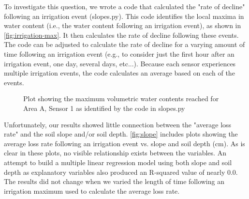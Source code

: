 \documentclass[12pt]{scrartcl}
\begin{document}
To investigate this question, we wrote a code that calculated the "rate of decline" following an irrigation event (slopes.py). This code identifies the local maxima in water content (i.e., the water content following an irrigation event), as shown in \autoref{fig:irrigation-max}. It then calculates the rate of decline following these events. The code can be adjusted to calculate the rate of decline for a varying amount of time following an irrigation event (e.g., to consider just the first hour after an irrigation event, one day, several days, etc...). Because each sensor experiences multiple irrigation events, the code calculates an average based on each of the events.

\begin{figure}[!htb]
        \caption{\label{fig:irrigation-max} Plot showing the maximum volumetric water contents reached for Area A, Sensor 1 as identified by the code in slopes.py}
\end{figure}

Unfortunately, our results showed little connection between the "average loss rate" and the soil slope and/or soil depth. \autoref{fig:slope} includes plots showing the average loss rate following an irrigation event vs. slope and soil depth (cm). As is clear in these plots, no visible relationship exists between the variables. An attempt to build a multiple linear regression model using both slope and soil depth as explanatory variables also produced an R-squared value of nearly 0.0. The results did not change when we varied the length of time following an irrigation maximum used to calculate the average loss rate.
\end{document}
